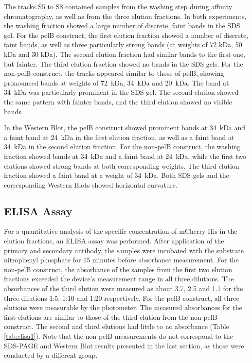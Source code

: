 \documentclass[a4paper,12pt]{article}
\begin{document}
The tracks S5 to S8 contained samples from the washing step during affinity chromatography, as well as from the three elution fractions. In both experiments, the washing fraction showed a large number of discrete, faint bands in the SDS gel. For the pelB construct, the first elution fraction showed a number of discrete, faint bands, as well as three particularly strong bands (at weights of 72 kDa, 50 kDa and 30 kDa). The second elution fraction had similar bands to the first one, but fainter. The third elution fraction showed no bands in the SDS gels. For the non-pelB construct, the tracks appeared similar to those of pelB, showing pronounced bands at weights of 72~kDa, 34~kDa and 20~kDa. The band at 34~kDa was particularly prominent in the SDS gel. The second elution showed the same pattern with fainter bands, and the third elution showed no visible bands.

In the Western Blot, the pelB construct showed prominent bands at 34~kDa  and a faint band at 24~kDa in the first elution fraction, as well as a faint band at 34~kDa in the second elution fraction. For the non-pelB construct, the washing fraction showed bands at 34~kDa and a faint band at 24~kDa, while the first two elutions showed strong bands at both corresponding weights. The third elution fraction showed a faint band at a weight of 34~kDa. Both SDS gels and the corresponding Western Blots showed horizontal curvature.





\subsection{ELISA Assay}
For a quantitative analysis of the specific concentration of mCherry-His in the elution fractions, an ELISA assay was performed. After application of the primary and secondary antibody, the samples were incubated with the substrate nitrophenyl phosphate for 15 minutes before absorbance measurement. For the non-pelB construct, the absorbance of the samples from the first two elution fractions exceeded the device's measurement range in all three dilutions. The absorbances of the third elution were measured as about 3.7, 2.5 and 1.1 for the three dilutions 1:5, 1:10 and 1:20 respectively. For the pelB construct, all three elutions were measurable by the photometer. The measured absorbances for the first elutions are similar to those of the third elution from the non-pelB construct. The second and third elutions had little to no absorbance (Table \ref{tab:elisa1}). Note that the non-pelB measurements do not correspond to the SDS-PAGE and Western Blot results presented in the last section, as those were conducted by a different group.
\end{document}

